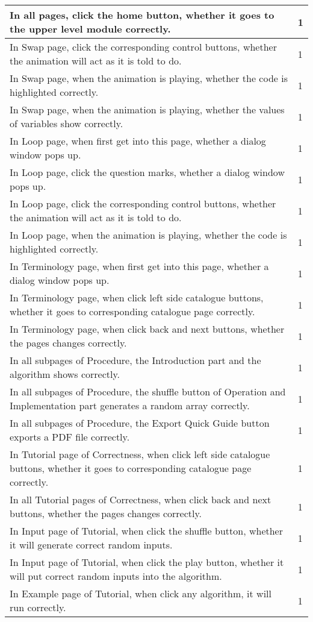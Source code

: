 \documentclass[
]{article}
\begin{document}
\begin{longtable}[]{@{}ll@{}}
\toprule
In all pages, click the home button, whether it goes to the upper level
module correctly. & 1 \\
\midrule
\endhead
In Swap page, click the corresponding control buttons, whether the
animation will act as it is told to do. & 1 \\
In Swap page, when the animation is playing, whether the code is
highlighted correctly. & 1 \\
In Swap page, when the animation is playing, whether the values of
variables show correctly. & 1 \\
In Loop page, when first get into this page, whether a dialog window
pops up. & 1 \\
In Loop page, click the question marks, whether a dialog window pops up.
& 1 \\
In Loop page, click the corresponding control buttons, whether the
animation will act as it is told to do. & 1 \\
In Loop page, when the animation is playing, whether the code is
highlighted correctly. & 1 \\
In Terminology page, when first get into this page, whether a dialog
window pops up. & 1 \\
In Terminology page, when click left side catalogue buttons, whether it
goes to corresponding catalogue page correctly. & 1 \\
In Terminology page, when click back and next buttons, whether the pages
changes correctly. & 1 \\
In all subpages of Procedure, the Introduction part and the algorithm
shows correctly. & 1 \\
In all subpages of Procedure, the shuffle button of Operation and
Implementation part generates a random array correctly. & 1 \\
In all subpages of Procedure, the Export Quick Guide button exports a
PDF file correctly. & 1 \\
In Tutorial page of Correctness, when click left side catalogue buttons,
whether it goes to corresponding catalogue page correctly. & 1 \\
In all Tutorial pages of Correctness, when click back and next buttons,
whether the pages changes correctly. & 1 \\
In Input page of Tutorial, when click the shuffle button, whether it
will generate correct random inputs. & 1 \\
In Input page of Tutorial, when click the play button, whether it will
put correct random inputs into the algorithm. & 1 \\
In Example page of Tutorial, when click any algorithm, it will run
correctly. & 1 \\
\bottomrule
\end{longtable}
\end{document}
